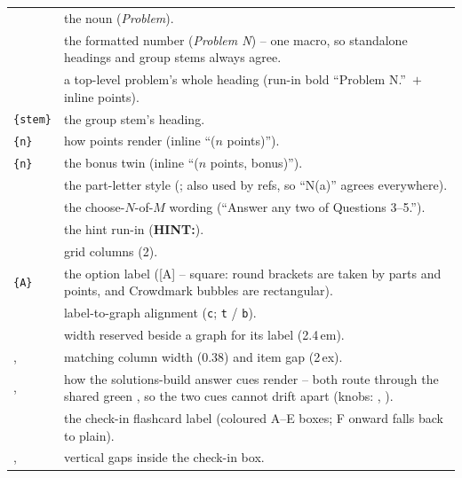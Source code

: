 \begin{center}
\begin{tabularx}{\linewidth}{@{}l Y@{}}
 & the noun (\emph{Problem}).\\
 & the formatted number (\emph{Problem N}) -- one
  macro, so standalone headings and group stems always agree.\\
 & a top-level problem's whole heading (run-in
  bold ``Problem N.''\ $+$ inline points).\\
\texttt{\{stem\}} & the group stem's
  heading.\\
\texttt{\{n\}} & how points render (inline
  ``($n$ points)'').\\
\texttt{\{n\}} & the bonus twin (inline
  ``($n$ points, bonus)'').\\
 & the part-letter style (; also used by
  refs, so ``N(a)'' agrees everywhere).\\
 & the choose-$N$-of-$M$ wording (``Answer
  any two of Questions 3--5.'').\\
 & the hint run-in (\textbf{HINT:}).\\
 & grid columns (2).\\
\texttt{\{A\}} & the option label ([A] -- square:
  round brackets are taken by parts and points, and Crowdmark bubbles are
  rectangular).\\
 & label-to-graph alignment (\texttt{c}; \texttt{t}
  / \texttt{b}).\\
 & width reserved beside a graph for its label
  (2.4\,em).\\
,  & matching column width
  (0.38) and item gap (2\,ex).\\
,  & how the solutions-build
  answer cues render -- both route through the shared green
  , so the two cues cannot drift apart
  (knobs: , ).\\
 & the check-in flashcard label (coloured A--E
  boxes; F onward falls back to plain).\\
,  & vertical gaps inside the
  check-in box.\\
\end{tabularx}
\end{center}
